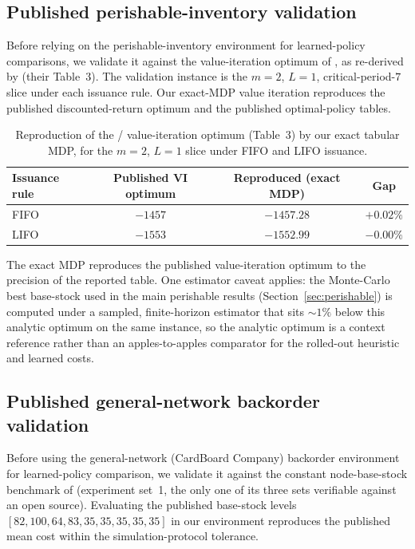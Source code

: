\documentclass[11pt]{article}
\begin{document}
\subsection{Published perishable-inventory validation}
\label{app:perishable-validation}

Before relying on the perishable-inventory environment for learned-policy comparisons, we validate it
against the value-iteration optimum of \citet{deMoor2022perishable}, as re-derived by
\citet{farrington2025perishable} (their Table~3). The validation instance is the $m=2$, $L=1$,
critical-period-$7$ slice under each issuance rule. Our exact-MDP value iteration reproduces
the published discounted-return optimum and the published optimal-policy tables.

\begin{table}[!htbp]
\centering
\caption{Reproduction of the \citet{deMoor2022perishable} / \citet{farrington2025perishable}
value-iteration optimum (Table~3) by our exact tabular MDP, for the $m=2$, $L=1$ slice under FIFO and
LIFO issuance.}
\label{tab:perishable-validation}
\begin{tabular}{lccc}
\toprule
Issuance rule & Published VI optimum & Reproduced (exact MDP) & Gap \\
\midrule
FIFO & $-1457$ & $-1457.28$ & $+0.02\%$ \\
LIFO & $-1553$ & $-1552.99$ & $-0.00\%$ \\
\bottomrule
\end{tabular}
\end{table}
\FloatBarrier

The exact MDP reproduces the published value-iteration optimum to the precision of the reported table.
One estimator caveat applies: the Monte-Carlo best base-stock used in the main perishable results
(Section~\ref{sec:perishable}) is computed under a sampled, finite-horizon estimator that sits
$\sim 1\%$ below this analytic optimum on the same instance, so the analytic optimum is a context
reference rather than an apples-to-apples comparator for the rolled-out heuristic and learned costs.

\subsection{Published general-network backorder validation}
\label{app:general-backorder-validation}

Before using the general-network (CardBoard Company) backorder environment for learned-policy
comparison, we validate it against the constant node-base-stock benchmark of
\citet{geevers2024cardboard} (experiment set~1, the only one of its three sets verifiable against an
open source). Evaluating the published base-stock levels $[82,100,64,83,35,35,35,35,35]$ in our
environment reproduces the published mean cost within the simulation-protocol tolerance.
\end{document}
